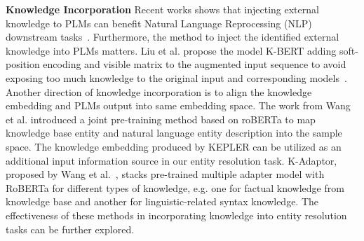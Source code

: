 \textbf{Knowledge Incorporation} %
Recent works shows that injecting external knowledge to PLMs can benefit Natural Language Reprocessing (NLP) downstream tasks~\cite{zhang_ernie_2019,peters_knowledge_2019,liu_k-bert_2020,wang_k-adapter_2021, wang_kepler_2021}. Furthermore, the method to inject the identified external knowledge into PLMs matters. Liu et al. propose the model K-BERT adding soft-position encoding and visible matrix to the augmented input sequence to avoid exposing too much knowledge to the original input and corresponding models~\cite{liu_k-bert_2020}. Another direction of knowledge incorporation is to align the knowledge embedding and PLMs output into same embedding space. The work from Wang et al. \cite{wang_kepler_2021} introduced a joint pre-training method based on roBERTa to map knowledge base entity and natural language entity description into the sample space. The knowledge embedding produced by KEPLER can be utilized as an additional input information source in our entity resolution task. K-Adaptor, proposed by Wang et al.~\cite{wang_k-adapter_2021}, stacks pre-trained multiple adapter model with RoBERTa for different types of knowledge, e.g. one for factual knowledge from knowledge base and another for linguistic-related syntax knowledge. The effectiveness of these methods in incorporating knowledge into entity resolution tasks can be further explored.